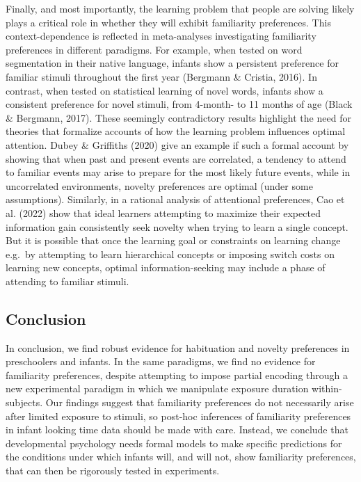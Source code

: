 \documentclass[10pt, letterpaper]{article}
\begin{document}
Finally, and most importantly, the learning problem that people are
solving likely plays a critical role in whether they will exhibit
familiarity preferences. This context-dependence is reflected in
meta-analyses investigating familiarity preferences in different
paradigms. For example, when tested on word segmentation in their native
language, infants show a persistent preference for familiar stimuli
throughout the first year (Bergmann \& Cristia, 2016). In contrast, when
tested on statistical learning of novel words, infants show a consistent
preference for novel stimuli, from 4-month- to 11 months of age (Black
\& Bergmann, 2017). These seemingly contradictory results highlight the
need for theories that formalize accounts of how the learning problem
influences optimal attention. Dubey \& Griffiths (2020) give an example
if such a formal account by showing that when past and present events
are correlated, a tendency to attend to familiar events may arise to
prepare for the most likely future events, while in uncorrelated
environments, novelty preferences are optimal (under some assumptions).
Similarly, in a rational analysis of attentional preferences, Cao et al.
(2022) show that ideal learners attempting to maximize their expected
information gain consistently seek novelty when trying to learn a single
concept. But it is possible that once the learning goal or constraints
on learning change e.g.~by attempting to learn hierarchical concepts or
imposing switch costs on learning new concepts, optimal
information-seeking may include a phase of attending to familiar
stimuli.

\hypertarget{conclusion}{%
\subsection{Conclusion}\label{conclusion}}

In conclusion, we find robust evidence for habituation and novelty
preferences in preschoolers and infants. In the same paradigms, we find
no evidence for familiarity preferences, despite attempting to impose
partial encoding through a new experimental paradigm in which we
manipulate exposure duration within-subjects. Our findings suggest that
familiarity preferences do not necessarily arise after limited exposure
to stimuli, so post-hoc inferences of familiarity preferences in infant
looking time data should be made with care. Instead, we conclude that
developmental psychology needs formal models to make specific
predictions for the conditions under which infants will, and will not,
show familiarity preferences, that can then be rigorously tested in
experiments.
\end{document}
